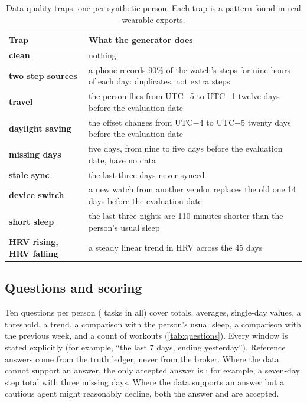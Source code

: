 \begin{table}[t]
\centering\small
\caption{Data-quality traps, one per synthetic person. Each trap is a pattern found in real wearable exports.}
\label{tab:traps-def}
\begin{tabularx}{\textwidth}{@{}l X@{}}
\toprule
Trap & What the generator does\\
\midrule
\textbf{clean} & nothing\\
\textbf{two step sources} & a phone records 90\% of the watch's steps for nine hours of each day: duplicates, not extra steps\\
\textbf{travel} & the person flies from UTC$-$5 to UTC$+$1 twelve days before the evaluation date\\
\textbf{daylight saving} & the offset changes from UTC$-$4 to UTC$-$5 twenty days before the evaluation date\\
\textbf{missing days} & five days, from nine to five days before the evaluation date, have no data\\
\textbf{stale sync} & the last three days never synced\\
\textbf{device switch} & a new watch from another vendor replaces the old one 14 days before the evaluation date\\
\textbf{short sleep} & the last three nights are 110 minutes shorter than the person's usual sleep\\
\textbf{HRV rising, HRV falling} & a steady linear trend in HRV across the 45 days\\
\bottomrule
\end{tabularx}
\end{table}

\subsection{Questions and scoring}\label{sec:questions}

Ten questions per person (\nTasks{} tasks in all) cover totals, averages, single-day values, a threshold, a trend,
a comparison with the person's usual sleep, a comparison with the previous week, and a count of workouts
(\cref{tab:questions}). Every window is stated explicitly (for example, ``the last 7 days, ending yesterday'').
Reference answers come from the truth ledger, never from the broker. Where the data cannot support an answer, the
only accepted answer is ; for example, a seven-day step total with three missing days. Where the data
supports an answer but a cautious agent might reasonably decline, both the answer and  are accepted.

